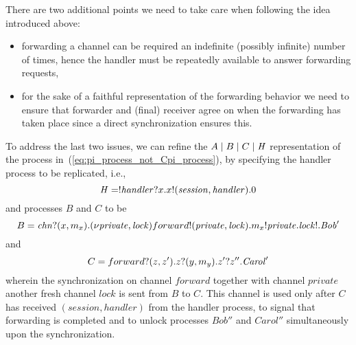 There are two additional points we need to take care when following the idea introduced above: 
\begin{itemize}
\item forwarding a channel can be required an indefinite (possibly infinite) number of times, hence the handler must be repeatedly available to answer forwarding requests,
\item for the sake of a faithful representation of the forwarding behavior we need to ensure that forwarder and (final) receiver agree on when the forwarding has taken place since a direct synchronization ensures this. 
\end{itemize}
To address the last two issues, we can refine the $A \;|\; B \;|\; C \;|\; \mathit{H}$ representation of the process in~(\ref{eq:pi_process_not_Cpi_process}), by specifying the handler process to be replicated, i.e., 
\[
\mathit{H}= ! \mathit{handler}?x.x!(\mathit{session},\mathit{handler}).0
\]
and processes $B$ and $C$ to be
\[
B=\mathit{chn}?(x, m_x).(\nu \mathit{private}, \mathit{lock})forward!(\mathit{private}, \mathit{lock}).m_x!\mathit{private}.\mathit{lock}!.\mathit{Bob}'
\]
and 
\[
C=forward?(z,z').z?(y,m_y).z'?z''.\mathit{Carol}'
\]
wherein the synchronization on channel $\mathit{forward}$ together with  channel $\mathit{private}$ another fresh channel $\mathit{lock}$ is sent from $B$ to $C$. This channel is used only after $C$ has received $(\mathit{session}, \mathit{handler})$ from the handler process, to signal that forwarding is completed and to unlock processes $\mathit{Bob}''$  and $\mathit{Carol}''$ simultaneously upon the synchronization. 



